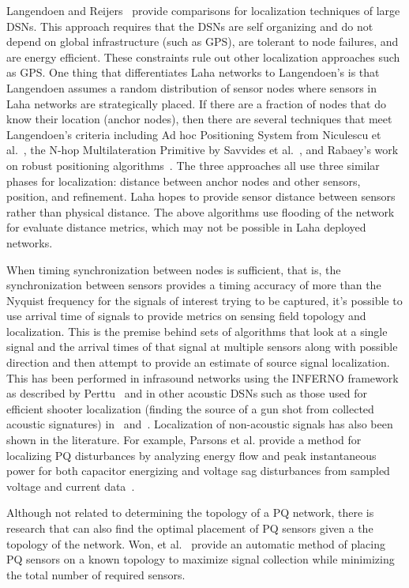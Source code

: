 Langendoen and Reijers~\cite{langendoen2003distributed} provide comparisons for localization techniques of large DSNs. This approach requires that the DSNs are self organizing and do not depend on global infrastructure (such as GPS), are tolerant to node failures, and are energy efficient. These constraints rule out other localization approaches such as GPS. One thing that differentiates Laha networks to Langendoen's is that Langendoen assumes a random distribution of sensor nodes where sensors in Laha networks are strategically placed. If there are a fraction of nodes that do know their location (anchor nodes), then there are several techniques that meet Langendoen's criteria including Ad hoc Positioning System from Niculescu et al.~\cite{niculescu2003ad}, the N-hop Multilateration Primitive by Savvides et al.~\cite{savvides2002bits}, and Rabaey's work on robust positioning algorithms~\cite{rabaey2002robust}. The three approaches all use three similar phases for localization: distance between anchor nodes and other sensors, position, and refinement. Laha hopes to provide sensor distance between sensors rather than physical distance. The above algorithms use flooding of the network for evaluate distance metrics, which may not be possible in Laha deployed networks.

When timing synchronization between nodes is sufficient, that is, the synchronization between sensors provides a timing accuracy of more than the Nyquist frequency for the signals of interest trying to be captured, it's possible to use arrival time of signals to provide metrics on sensing field topology and localization. This is the premise behind sets of algorithms that look at a single signal and the arrival times of that signal at multiple sensors along with possible direction and then attempt to provide an estimate of source signal localization. This has been performed in infrasound networks using the INFERNO framework as described by Perttu~\cite{perttu2013regional} and in other acoustic DSNs such as those used for efficient shooter localization (finding the source of a gun shot from collected acoustic signatures) in~\cite{gezici2005localization} and~\cite{maroti2004shooter}. Localization of non-acoustic signals has also been shown in the literature. For example, Parsons et al. provide a method for localizing PQ disturbances by analyzing energy flow and peak instantaneous power for both capacitor energizing  and voltage sag disturbances from sampled voltage and current data~\cite{parsons1998direction}.

Although not related to determining the topology of a PQ network, there is research that can also find the optimal placement of PQ sensors given a the topology of the network. Won, et al.~\cite{won2008optimal} provide an automatic method of placing PQ sensors on a known topology to maximize signal collection while minimizing the total number of required sensors.

